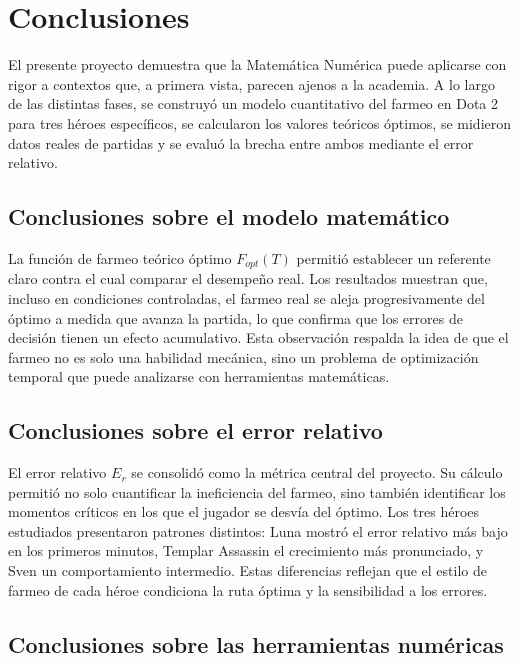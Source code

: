 \section{Conclusiones}

El presente proyecto demuestra que la Matemática Numérica puede aplicarse con rigor a contextos que, a primera vista, parecen ajenos a la academia. A lo largo de las distintas fases, se construyó un modelo cuantitativo del farmeo en Dota 2 para tres héroes específicos, se calcularon los valores teóricos óptimos, se midieron datos reales de partidas y se evaluó la brecha entre ambos mediante el error relativo.

\subsection{Conclusiones sobre el modelo matemático}

La función de farmeo teórico óptimo \(F_{opt}(T)\) permitió establecer un referente claro contra el cual comparar el desempeño real. Los resultados muestran que, incluso en condiciones controladas, el farmeo real se aleja progresivamente del óptimo a medida que avanza la partida, lo que confirma que los errores de decisión tienen un efecto acumulativo. Esta observación respalda la idea de que el farmeo no es solo una habilidad mecánica, sino un problema de optimización temporal que puede analizarse con herramientas matemáticas.

\subsection{Conclusiones sobre el error relativo}

El error relativo \(E_r\) se consolidó como la métrica central del proyecto. Su cálculo permitió no solo cuantificar la ineficiencia del farmeo, sino también identificar los momentos críticos en los que el jugador se desvía del óptimo. Los tres héroes estudiados presentaron patrones distintos: Luna mostró el error relativo más bajo en los primeros minutos, Templar Assassin el crecimiento más pronunciado, y Sven un comportamiento intermedio. Estas diferencias reflejan que el estilo de farmeo de cada héroe condiciona la ruta óptima y la sensibilidad a los errores.

\subsection{Conclusiones sobre las herramientas numéricas}

